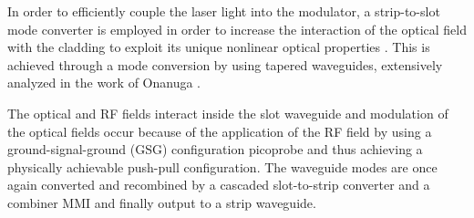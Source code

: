 

In order to efficiently couple the laser light into the modulator, a strip-to-slot mode converter is employed in order to increase the interaction of the optical field with the cladding to exploit its unique nonlinear optical properties \cite{PalmerSSconv13}. This is achieved through a mode conversion by using tapered waveguides, extensively analyzed in the work of Onanuga \cite{TapWGOnanuga14}.

The optical and RF fields interact inside the slot waveguide and modulation of the optical fields occur because of the application of the RF field by using a ground-signal-ground (GSG) configuration picoprobe and thus achieving a physically achievable push-pull configuration. The waveguide modes are once again converted and recombined by a cascaded slot-to-strip converter and a combiner MMI and finally output to a strip waveguide. 
 

